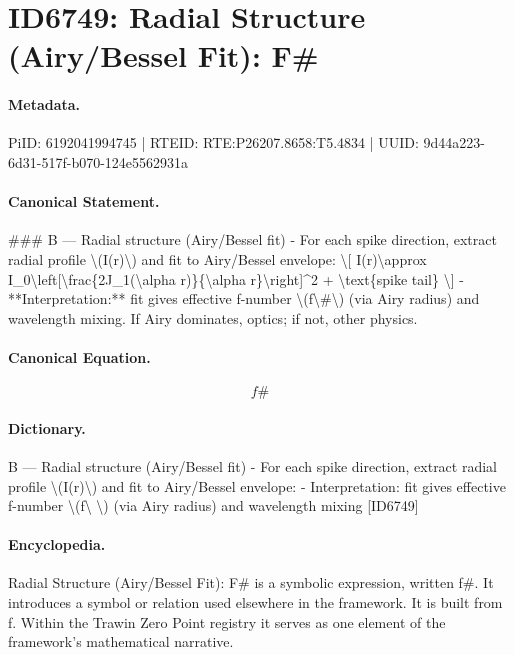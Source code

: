 \section*{ID6749: Radial Structure (Airy/Bessel Fit): F\#}
\paragraph{Metadata.}
PiID: 6192041994745 | RTEID: RTE:P26207.8658:T5.4834 | UUID: 9d44a223-6d31-517f-b070-124e5562931a

\paragraph{Canonical Statement.}
\#\#\# B — Radial structure (Airy/Bessel fit) - For each spike direction, extract radial profile \textbackslash{}(I(r)\textbackslash{}) and fit to Airy/Bessel envelope: \textbackslash{}[ I(r)\textbackslash{}approx I\_0\textbackslash{}left[\textbackslash{}frac\{2J\_1(\textbackslash{}alpha r)\}\{\textbackslash{}alpha r\}\textbackslash{}right]\textasciicircum{}2 + \textbackslash{}text\{spike tail\} \textbackslash{}] - **Interpretation:** fit gives effective f-number \textbackslash{}(f\textbackslash{}\#\textbackslash{}) (via Airy radius) and wavelength mixing. If Airy dominates, optics; if not, other physics.

\paragraph{Canonical Equation.}
\[
f\#
\]

\paragraph{Dictionary.}
B — Radial structure (Airy/Bessel fit) - For each spike direction, extract radial profile \textbackslash{}(I(r)\textbackslash{}) and fit to Airy/Bessel envelope: - Interpretation: fit gives effective f-number \textbackslash{}(f\textbackslash{} \textbackslash{}) (via Airy radius) and wavelength mixing [ID6749]

\paragraph{Encyclopedia.}
Radial Structure (Airy/Bessel Fit): F\# is a symbolic expression, written f\#. It introduces a symbol or relation used elsewhere in the framework. It is built from f. Within the Trawin Zero Point registry it serves as one element of the framework's mathematical narrative.
